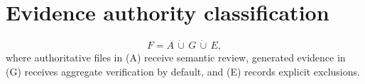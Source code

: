 \documentclass{article}
\begin{document}
\section*{Evidence authority classification}
\label{assumption:evidence-classification}
\[
F=A\,\dot\cup\,G\,\dot\cup\,E,
\]
where authoritative files in (A) receive semantic review, generated evidence in (G) receives aggregate verification by default, and (E) records explicit exclusions.
\end{document}
